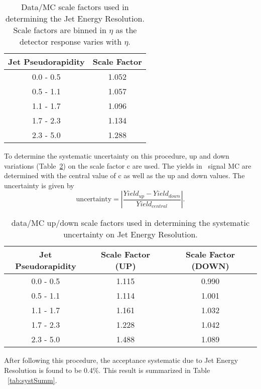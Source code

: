 \begin{table}[h]
\caption{ \label{tab:jer_scalefactor} Data/MC scale factors used in determining the Jet Energy Resolution. Scale factors are binned in $\eta$ as the detector response varies with $\eta$.}
\begin{center}
\begin{tabular}{c|c}\hline
Jet Pseudorapidity & Scale Factor \\ \hline \hline
0.0 - 0.5 & 1.052 \\
0.5 - 1.1 & 1.057 \\
1.1 - 1.7 & 1.096 \\
1.7 - 2.3 & 1.134 \\
2.3 - 5.0 & 1.288 \\
\hline
\hline
\end{tabular}
\end{center}
\end{table}

To determine the systematic uncertainty on this procedure, up and down variations (Table~\ref{tab:jer_scalefactor_updown}) on the scale factor c are used. The yields in \ttZ \ signal MC are determined with the central value of c as well as the up and down values. The uncertainty is given by
\begin{equation}
\mathrm{uncertainty} = \left| \frac{Yield _{up} - Yield _{down}}{Yield _{central}} \right|.
\end{equation}

\begin{table}[h]
\caption{ \label{tab:jer_scalefactor_updown} data/MC up/down scale factors used in determining the systematic uncertainty on Jet Energy Resolution.}
\begin{center}
\begin{tabular}{c|c|c}\hline
Jet Pseudorapidity & Scale Factor (UP) & Scale Factor (DOWN)\\ \hline \hline
0.0 - 0.5 & 1.115 & 0.990 \\
0.5 - 1.1 & 1.114 & 1.001 \\
1.1 - 1.7 & 1.161 & 1.032 \\
1.7 - 2.3 & 1.228 & 1.042 \\
2.3 - 5.0 & 1.488 & 1.089 \\
\hline
\hline
\end{tabular}
\end{center}
\end{table}

After following this procedure, the acceptance systematic due to Jet Energy Resolution is found to be 0.4\%. This result is summarized in Table ~\ref{tab:systSumm}.\\

